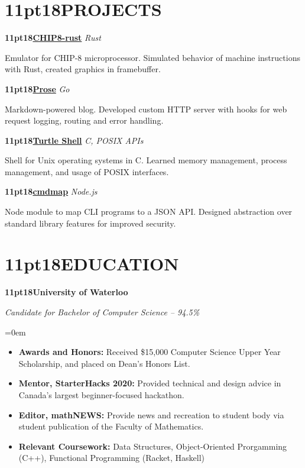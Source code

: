 \documentclass{article}
\makeatletter
\renewcommand\large{\@setfontsize\Large{11pt}{18}}
\newcommand{\NewPart}[1]{\vspace{-1mm}\section*{\large \uppercase{#1}}\vspace{-1mm}}
\newcommand{\EducationEntry}[4]{
    \noindent \textbf{\large #1} \hfill      %
    \smash{\colorbox{Black}{%
      {%
      \hfill\color{White}\strut ~#2~}}} \par  %
      \vspace{0.5mm}
    \noindent \textit{#3} \par        %
    \noindent\hangindent=0em\hangafter=0 #4 %
    \par}
\newcommand{\ProjectEntry}[4]{         %
    \noindent \textbf{\large #1} \noindent \textit{#3} \hfill {#2} \par
    \vspace{0.5mm}
    \noindent #4 %
    \par}
\makeatother
\begin{document}
\NewPart{Projects}{}
\normalsize
\ProjectEntry{\href{https://github.com/namansood/chip8-rust}{CHIP8-rust}}{}
{Rust}
{Emulator for CHIP-8 microprocessor. Simulated behavior of machine instructions with
Rust, created graphics in framebuffer.}
\vspace{2mm}
\ProjectEntry{\href{https://github.com/namansood/prose}{Prose}}{}
{Go}
{Markdown-powered blog. Developed custom HTTP server with hooks for web request logging, routing 
and error handling.}
\vspace{2mm}
\ProjectEntry{\href{https://github.com/namansood/tsh}{Turtle Shell}}{}
{C, POSIX APIs}
{Shell for Unix operating systems in C. Learned memory management, process management,
and usage of POSIX interfaces. }
\vspace{2mm}
\ProjectEntry{\href{https://github.com/namansood/cmdmap}{cmdmap}}{}
{Node.js}
{Node module to map CLI programs to a JSON API. Designed abstraction over standard
library features for improved security.}

\NewPart{Education}{}
\EducationEntry
{University of Waterloo}
{Sep 2019 -- Apr 2024}
{Candidate for Bachelor of Computer Science -- 94.5\%}
{\begin{itemize} \itemsep -1pt
    \vspace{1mm}
    \item {\bf Awards and Honors:} Received \$15,000 Computer Science Upper Year Scholarship, and placed on Dean's Honors List.
    \item {\bf Mentor, StarterHacks 2020:} Provided technical and design advice in Canada's largest beginner-focused hackathon.
    \item {\bf Editor, mathNEWS:} Provide news and recreation to student body via student publication of the Faculty of Mathematics. 
    \item {\bf Relevant Coursework:} Data Structures, Object-Oriented Prorgamming (C++), Functional Programming (Racket, Haskell)
    \end{itemize}}
\ 
\end{document}
